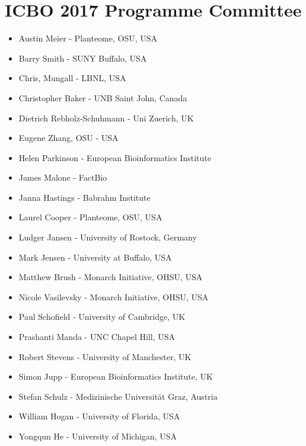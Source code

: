 \documentclass{article}
\begin{document}
\section*{ICBO 2017 Programme Committee}

\begin{itemize}
\item Austin Meier - Planteome, OSU, USA 
\item Barry Smith - SUNY Buffalo, USA 
\item Chris, Mungall - LBNL, USA 
\item Christopher Baker - UNB Saint John, Canada
\item Dietrich Rebholz-Schuhmann - Uni Zuerich, UK
\item Eugene Zhang, OSU - USA 
\item Helen Parkinson - European Bioinformatics Institute 
\item James Malone - FactBio
\item Janna Hastings - Babrahm Institute 
\item Laurel Cooper - Planteome, OSU, USA
\item Ludger Jansen - University of Rostock, Germany 
\item Mark Jensen - University at Buffalo, USA
\item Matthew Brush - Monarch Initiative, OHSU, USA 
\item Nicole Vasilevsky - Monarch Initiative, OHSU, USA 
\item Paul Schofield - University of Cambridge, UK 
\item Prashanti Manda - UNC Chapel Hill, USA 
\item Robert Stevens - University of Manchester, UK 
\item Simon Jupp - European Bioinformatics Institute, UK
\item Stefan Schulz - Medizinische Universität Graz, Austria
\item William Hogan - University of Florida, USA
\item Yongqun He - University of Michigan, USA
\end{itemize}
\end{document}
